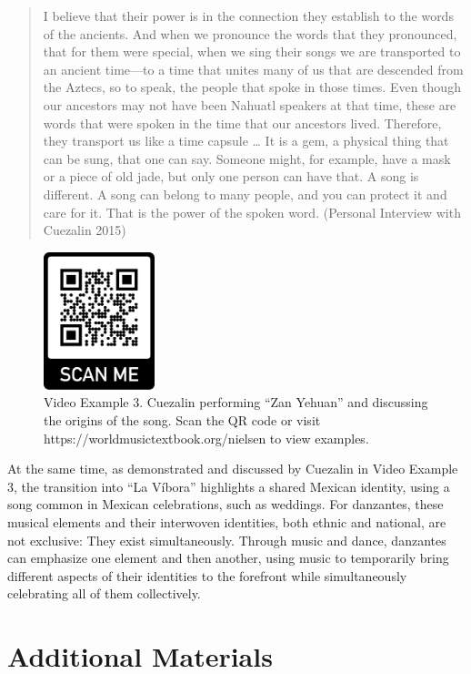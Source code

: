 \documentclass[twoside]{article}
\providecommand{\wmturl}{https://worldmusictextbook.org/nielsen}
\providecommand{\wmturlcaption}{
  Scan the QR code or visit \wmturl{} to view examples.
}
\begin{document}
\begin{quote}
I believe that their power is in the connection they establish to the
words of the ancients. And when we pronounce the words that they
pronounced, that for them were special, when we sing their songs we are
transported to an ancient time---to a time that unites many of us that
are descended from the Aztecs, so to speak, the people that spoke in
those times. Even though our ancestors may not have been Nahuatl
speakers at that time, these are words that were spoken in the time that
our ancestors lived. Therefore, they transport us like a time capsule
\ldots{} It is a gem, a physical thing that can be sung, that one can
say. Someone might, for example, have a mask or a piece of old jade, but
only one person can have that. A song is different. A song can belong to
many people, and you can protect it and care for it. That is the power
of the spoken word. (Personal Interview with Cuezalin 2015)
\end{quote}

\begin{figure}
  \centering
  \includegraphics[height=4cm]{qr-rick.png}
  \caption*{Video Example 3. Cuezalin performing ``Zan Yehuan'' and discussing the origins of the song. \wmturlcaption}
\end{figure}

At the same time, as demonstrated and discussed by Cuezalin in Video
Example 3, the transition into ``La Víbora'' highlights a shared Mexican
identity, using a song common in Mexican celebrations, such as weddings.
For danzantes, these musical elements and their interwoven identities,
both ethnic and national, are not exclusive: They exist simultaneously.
Through music and dance, danzantes can emphasize one element and then
another, using music to temporarily bring different aspects of their
identities to the forefront while simultaneously celebrating all of them
collectively.

\hypertarget{additional-materials}{%
\section*{Additional Materials}\label{additional-materials}}
\end{document}
